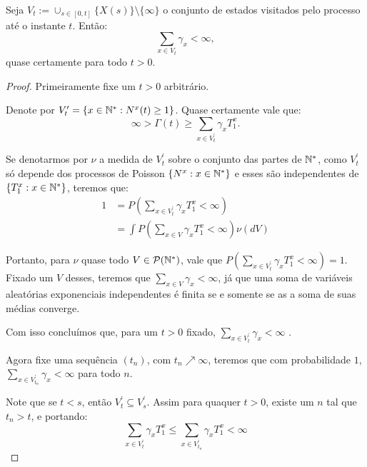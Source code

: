 \begin{proposicao}
  \label{prop:gamma-somavel}
  Seja $V_t := \cup_{s \in [0, t]} \{ X(s) \} \setminus \{\infty\}$ o
  conjunto de estados visitados pelo processo até o instante
  $t$. Então:
  \begin{displaymath}
    \sum_{x \in V_t} \gamma_x < \infty,
  \end{displaymath}
  quase certamente para todo $t > 0$.
\end{proposicao}
\begin{proof}

  Primeiramente fixe um $t > 0$ arbitrário.

  Denote por $V^\prime_t = \{ x \in {\mathbb{N^*}}: N^x(t) \geq 1 \}$. Quase
  certamente vale que:
  \begin{displaymath}
    \infty > \Gamma(t) \geq \sum_{x \in V^\prime_t} \gamma_x T^x_1.
  \end{displaymath}

  Se denotarmos por $\nu$ a medida de $V^\prime_t$ sobre o conjunto
  das partes de ${\mathbb{N^*}}$, como $V^\prime_t$ só depende dos processos de
  Poisson $\{N^x: x \in {\mathbb{N^*}}\}$ e esses são independentes de $\{ T^x_1:
  x \in {\mathbb{N^*}} \}$, teremos que:
  \begin{align*}
    1 &= P\left(\sum_{x \in V^\prime_t} \gamma_x T^x_1 < \infty
    \right)\\
    &=\int P\left(\sum_{x \in V} \gamma_x T^x_1 < \infty
    \right) \nu(dV)
  \end{align*}

  Portanto, para $\nu$ quase todo $V \in {\mathcal{P}}({\mathbb{N^*}})$, vale que
  $P(\sum_{x \in V^\prime_t} \gamma_x T^x_1 < \infty) = 1$. Fixado um
  $V$ desses, teremos que $\sum_{x \in V}\gamma_x < \infty$, já que
  uma soma de variáveis aleatórias exponenciais independentes é finita
  \qc se e somente se as a soma de suas médias converge.

  Com isso concluímos que, para um $t>0$ fixado, $\sum_{x \in
    V^\prime_t}\gamma_x < \infty$ \qc.

  Agora fixe uma sequência $(t_n)$, com $t_n\nearrow \infty$, teremos
  que com probabilidade $1$, $\sum_{x \in V^\prime_{t_n}}\gamma_x <
  \infty$ para todo $n$.

  Note que se $t < s$, então $V^\prime_t \subseteq V^\prime_s$. Assim
  para quaquer $t > 0$, existe um $n$ tal que $t_n > t$, e portando:
  \begin{displaymath}
    \sum_{x \in V^\prime_t}\gamma_x T^x_1 \leq
    \sum_{x \in V^\prime_{t_n}}\gamma_x T^x_1 < \infty
  \end{displaymath}


\end{proof}
